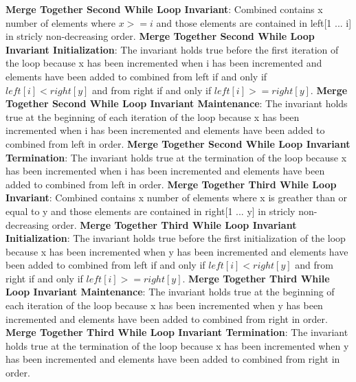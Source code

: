 \documentclass[onecolumn, 12pt, article]{IEEEtran}
\numberwithin{case}{problem}
\numberwithin{condition}{problem}
\numberwithin{condition}{subsection}
\numberwithin{definition}{section}
\theoremstyle{remark}
\numberwithin{question}{problem}
\theoremstyle{plain}
\numberwithin{answer}{problem}
\numberwithin{solution}{section}
\numberwithin{equation}{section}%
\begin{document}
\newline
\newline
\textbf{Merge Together Second While Loop Invariant}: Combined contains x number of elements where $x >= i$ and those elements are contained in left[1 ... i] in stricly non-decreasing order.
\newline
\textbf{Merge Together Second While Loop Invariant Initialization}: The invariant holds true before the first iteration of the loop because x has been incremented when i has been incremented and elements have been added to combined from left if and only if $left[i] < right[y]$ and from right if and only if $left[i] >= right[y]$.
\newline
\textbf{Merge Together Second While Loop Invariant Maintenance}: The invariant holds true at the beginning of each iteration of the loop because x has been incremented when i has been incremented and elements have been added to combined from left in order.
\newline
\textbf{Merge Together Second While Loop Invariant Termination}: The invariant holds true at the termination of the loop because x has been incremented when i has been incremented and elements have been added to combined from left in order.
\newline
\newline
\textbf{Merge Together Third While Loop Invariant}: Combined contains x number of elements where x is greather than or equal to y and those elements are contained in right[1 ... y] in stricly non-decreasing order.
\newline
\textbf{Merge Together Third While Loop Invariant Initialization}: The invariant holds true before the first initialization of the loop because x has been incremented when y has been incremented and elements have been added to combined from left if and only if $left[i] < right[y]$ and from right if and only if $left[i] >= right[y]$.
\newline
\textbf{Merge Together Third While Loop Invariant Maintenance}: The invariant holds true at the beginning of each iteration of the loop because x has been incremented when y has been incremented and elements have been added to combined from right in order.
\newline
\textbf{Merge Together Third While Loop Invariant Termination}: The invariant holds true at the termination of the loop because x has been incremented when y has been incremented and elements have been added to combined from right in order.
\newline
\newline
\end{document}
